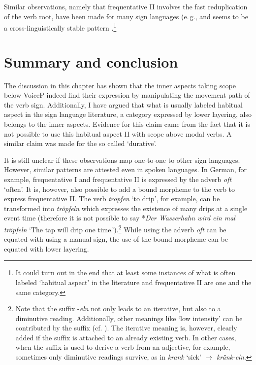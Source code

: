 \noindent Similar observations, namely that frequentative II involves the fast reduplication of the verb root, have been made for many sign languages (e.\,g., \citealt{bergmandahl1994, sutton1999linguistics, meir2007language} and seems to be a cross-linguistically stable pattern \citep[227]{signgram2017}.\footnote{ It could turn out in the end that at least some instances of what is often labeled `habitual aspect' in the literature and frequentative II are one and the same category. }


\section{Summary and conclusion}
The discussion in this chapter has shown that the inner aspects taking scope below VoiceP indeed find their expression by manipulating the movement path of the verb sign. Additionally, I have argued that what is usually labeled habitual aspect in the sign language literature, a category expressed by lower layering, also belongs to the inner aspects. Evidence for this claim came from the fact that it is not possible to use this habitual aspect II with scope above modal verbs. A similar claim was made for the so called `durative'. 

It is still unclear if these observations map one-to-one to other sign languages. However, similar patterns are attested even in spoken languages. In German, for example, frequentative I and frequentative II is expressed by the adverb \textit{oft} `often'. It is, however, also possible to add a bound morpheme to the verb to express frequentative II. The verb \textit{tropfen} `to drip', for example, can be transformed into \textit{tröpfeln} which expresses the existence of many drips at a single event time (therefore it is not possible to say *\textit{Der Wasserhahn wird ein mal tröpfeln} `The tap will drip one time.').\footnote{ Note that the suffix -\textit{eln} not only leads to an iterative, but also to a diminutive reading. Additionally, other meanings like `low intensity' can be contributed by the suffix (cf. \citealt{weidhaasschmid2015diminutiv}). The iterative meaning is, however, clearly added if the suffix is attached to an already existing verb. In other cases, when the suffix is used to derive a verb from an adjective, for example, sometimes only diminutive readings survive, as in \textit{krank} `sick' $\rightarrow$ \textit{kränk-eln}.} While using the adverb \textit{oft} can be equated with using a manual sign, the use of the bound morpheme can be equated with lower layering.

